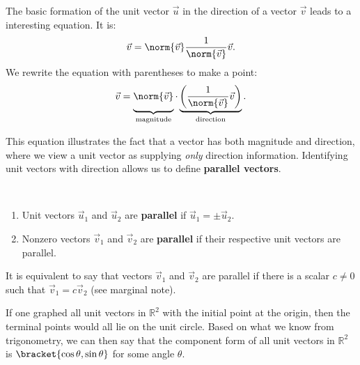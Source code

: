 The basic formation of the unit vector $\vec u$ in the direction of a vector $\vec v$ leads to a interesting equation. It is:
\[\vec v = \norm{\vec v}\frac{1}{\norm{\vec v}}\vec v.\]
We rewrite the equation with parentheses to make a point:
\[
\vec v
=\underbrace{\vphantom{\left(\frac1{\norm{\vec v}}\right)}\norm{\vec v}}_{\text{\scriptsize magnitude}}
\cdot
\underbrace{\left(\frac1{\norm{\vec v}}\vec v\right)}_{\text{\scriptsize direction}}.
\]

This equation illustrates the fact that a vector has both magnitude and direction, where we view a unit vector as supplying \emph{only} direction information. Identifying unit vectors with direction allows us to define \textbf{parallel vectors}.

\begin{definition}\label{def:parallel_vectors}
%
\mbox{}\\[-2\baselineskip]\parbox[t]{\linewidth}{\begin{enumerate}
	\item Unit vectors $\vec u_1$ and $\vec u_2$ are \textbf{parallel} if $\vec u_1 = \pm \vec u_2$.
	\item	Nonzero vectors $\vec v_1$ and $\vec v_2$ are \textbf{parallel} if their respective unit vectors are parallel.
\end{enumerate}}
\end{definition}


It is equivalent to say that vectors $\vec v_1$ and $\vec v_2$ are parallel if there is a scalar $c\neq 0$ such that $\vec v_1 = c\vec v_2$ (see marginal note).

If one graphed all unit vectors in $\mathbb{R}^2$ with the initial point at the origin, then the terminal points would all lie on the unit circle. Based on what we know from trigonometry, we can then say that the component form of all unit vectors in $\mathbb{R}^2$ is $\bracket{\cos\theta,\sin\theta}$ for some angle $\theta$.

